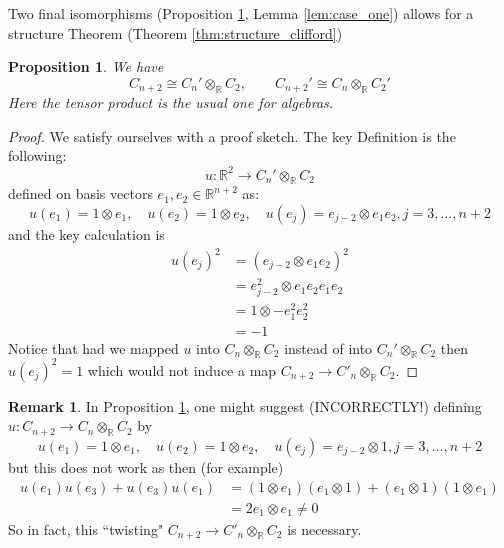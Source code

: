 \documentclass[12pt]{article}
\theoremstyle{plain}
\newtheorem{proposition}[thm]{Proposition}
\theoremstyle{definition}
\newtheorem{remark}[thm]{Remark}
\newcommand{\bb}[1]{\mathbb{#1}}
\newcommand{\lto}{\longrightarrow}
\begin{document}
	
	
	
	Two final isomorphisms (Proposition \ref{prop:complex_plus_two}, Lemma \ref{lem:case_one}) allows for a structure Theorem (Theorem \ref{thm:structure_clifford})
	\begin{proposition}\label{prop:complex_plus_two}
		We have
		\begin{equation}
			C_{n+2} \cong C_n' \otimes_{\bb{R}}C_2,\qquad C_{n+2}' \cong C_n \otimes_{\bb{R}}C_2'
		\end{equation}
		Here the tensor product is the usual one for algebras.
	\end{proposition}
	\begin{proof}
		We satisfy ourselves with a proof sketch. The key Definition is the following:
		\begin{equation}
			u: \bb{R}^2 \lto C_n' \otimes_{\bb{R}}C_2
		\end{equation}
		defined on basis vectors $e_1,e_2 \in \bb{R}^{n+2}$ as:
		\begin{equation}
			u(e_1) = 1 \otimes e_1,\quad u(e_2) = 1 \otimes e_2,\quad u(e_j) = e_{j-2} \otimes e_1e_2, j = 3,...,n+2
		\end{equation}
		and the key calculation is
		\begin{align*}
			u(e_j)^2 &= (e_{j - 2} \otimes e_1e_2)^2\\
			&= e_{j-2}^2 \otimes e_1e_2e_1e_2\\
			&= 1 \otimes -e_1^2e_2^2\\
			&= -1
		\end{align*}
		Notice that had we mapped $u$ into $C_n \otimes_{\bb{R}} C_2$ instead of into $C_n' \otimes_{\bb{R}}C_2$ then $u(e_{j})^2 = 1$ which would not induce a map $C_{n+2} \lto C'_n \otimes_{\bb{R}}C_2$.
	\end{proof}
	\begin{remark}
		In Proposition \ref{prop:complex_plus_two}, one might suggest (INCORRECTLY!) defining $u: C_{n+2} \lto C_n \otimes_{\bb{R}}C_2$ by
		\begin{equation}
			u(e_1) = 1 \otimes e_1,\quad u(e_2) = 1 \otimes e_2,\quad u(e_j) = e_{j-2} \otimes 1, j = 3,...,n+2
		\end{equation}
		but this does not work as then (for example)
		\begin{align*}
			u(e_1)u(e_3) + u(e_3)u(e_1) &= (1 \otimes e_1)(e_1 \otimes 1) + (e_1 \otimes 1)(1 \otimes e_1)\\
			&= 2e_1 \otimes e_1 \neq 0
		\end{align*}
		So in fact, this ``twisting" $C_{n+2} \lto C'_n \otimes_{\bb{R}}C_2$ is necessary.
	\end{remark}
\end{document}
